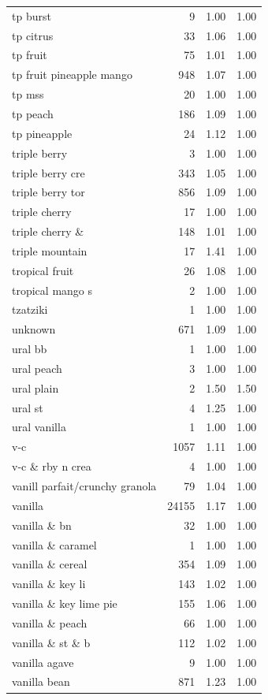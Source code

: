 \begin{table}
\begin{tabular}{lrrr}
tp burst & 9 & 1.00 & 1.00 \\
tp citrus & 33 & 1.06 & 1.00 \\
tp fruit & 75 & 1.01 & 1.00 \\
tp fruit pineapple mango & 948 & 1.07 & 1.00 \\
tp mss & 20 & 1.00 & 1.00 \\
tp peach & 186 & 1.09 & 1.00 \\
tp pineapple & 24 & 1.12 & 1.00 \\
triple berry & 3 & 1.00 & 1.00 \\
triple berry cre & 343 & 1.05 & 1.00 \\
triple berry tor & 856 & 1.09 & 1.00 \\
triple cherry & 17 & 1.00 & 1.00 \\
triple cherry \& & 148 & 1.01 & 1.00 \\
triple mountain & 17 & 1.41 & 1.00 \\
tropical fruit & 26 & 1.08 & 1.00 \\
tropical mango s & 2 & 1.00 & 1.00 \\
tzatziki & 1 & 1.00 & 1.00 \\
unknown & 671 & 1.09 & 1.00 \\
ural bb & 1 & 1.00 & 1.00 \\
ural peach & 3 & 1.00 & 1.00 \\
ural plain & 2 & 1.50 & 1.50 \\
ural st & 4 & 1.25 & 1.00 \\
ural vanilla & 1 & 1.00 & 1.00 \\
v-c & 1057 & 1.11 & 1.00 \\
v-c \& rby n crea & 4 & 1.00 & 1.00 \\
vanill parfait/crunchy granola & 79 & 1.04 & 1.00 \\
vanilla & 24155 & 1.17 & 1.00 \\
vanilla \& bn & 32 & 1.00 & 1.00 \\
vanilla \& caramel & 1 & 1.00 & 1.00 \\
vanilla \& cereal & 354 & 1.09 & 1.00 \\
vanilla \& key li & 143 & 1.02 & 1.00 \\
vanilla \& key lime pie & 155 & 1.06 & 1.00 \\
vanilla \& peach & 66 & 1.00 & 1.00 \\
vanilla \& st \& b & 112 & 1.02 & 1.00 \\
vanilla agave & 9 & 1.00 & 1.00 \\
vanilla bean & 871 & 1.23 & 1.00 \\

\end{tabular}
\end{table}
